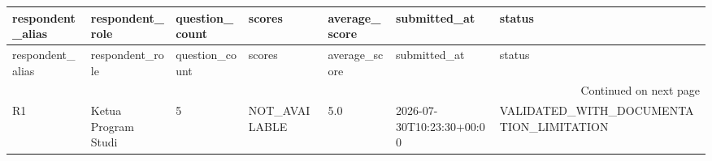 \begingroup
\scriptsize
\begin{longtable}{lllllll}
\toprule
respondent_alias & respondent_role & question_count & scores & average_score & submitted_at & status \\
\midrule
\endfirsthead
\toprule
respondent_alias & respondent_role & question_count & scores & average_score & submitted_at & status \\
\midrule
\endhead
\midrule
\multicolumn{7}{r}{Continued on next page} \\
\midrule
\endfoot
\bottomrule
\endlastfoot
R1 & Ketua Program Studi & 5 & NOT\_AVAILABLE & 5.0 & 2026-07-30T10:23:30+00:00 & VALIDATED\_WITH\_DOCUMENTATION\_LIMITATION \\
\end{longtable}
\endgroup
